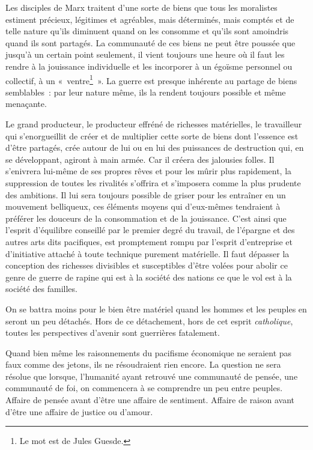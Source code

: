 \documentclass[french,twoside]{book} %
\newcommand{\astermono}{\medskip\centerline{\color{rubric}\large\selectfont{\syms ✻}}\medskip\par}%
\begin{document}
\astermono

\noindent Les disciples de Marx traitent d’une sorte de biens que tous les moralistes estiment précieux, légitimes et agréables, mais déterminés, mais comptés et de telle nature qu’ils diminuent quand on les consomme et qu’ils sont amoindris quand ils sont partagés. La communauté de ces biens ne peut être poussée que jusqu’à un certain point seulement, il vient toujours une heure où il faut les rendre à la jouissance individuelle et les incorporer à un égoïsme personnel ou collectif, à un « ventre\footnote{Le mot est de Jules Guesde.} ». La guerre est presque inhérente au partage de biens semblables : par leur nature même, ils la rendent toujours possible et même menaçante.\par

\astermono

\noindent Le grand producteur, le producteur effréné de richesses matérielles, le travailleur qui s’enorgueillit de créer et de multiplier cette sorte de biens dont l’essence est d’être partagés, crée autour de lui ou en lui des puissances de destruction qui, en se développant, agiront à main armée. Car il créera des jalousies folles. Il s’enivrera lui-même de ses propres rêves et pour les mûrir plus rapidement, la suppression de toutes les rivalités s’offrira et s’imposera comme la plus prudente des ambitions. Il lui sera toujours possible de griser pour les entraîner en un mouvement belliqueux, ces éléments moyens qui d’eux-mêmes tendraient à préférer les douceurs de la consommation et de la jouissance. C’est ainsi que l’esprit d’équilibre conseillé par le premier degré du travail, de l’épargne et des autres arts dits pacifiques, est promptement rompu par l’esprit d’entreprise et d’initiative attaché à toute technique purement matérielle. Il faut dépasser la conception des richesses divisibles et susceptibles d’être volées pour abolir ce genre de guerre de rapine qui est à la société des nations ce que le vol est à la société des familles.\par

\astermono

\noindent On se battra moins pour le bien être matériel quand les hommes et les peuples en seront un peu détachés. Hors de ce détachement, hors de cet esprit \emph{catholique}, toutes les perspectives d’avenir sont guerrières fatalement.\par

\astermono

\noindent Quand bien même les raisonnements du pacifisme économique ne seraient pas faux comme des jetons, ils ne résoudraient rien encore. La question ne sera résolue que lorsque, l’humanité ayant retrouvé une communauté de pensée, une communauté de foi, on commencera à se comprendre un peu entre peuples. Affaire de pensée avant d’être une affaire de sentiment. Affaire de raison avant d’être une affaire de justice ou d’amour.\par
\end{document}
